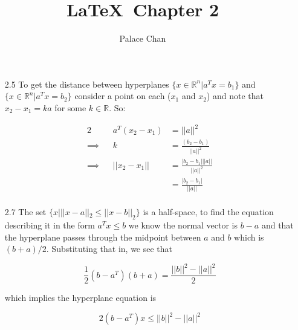 \documentclass[12pt]{article}
\title{\LaTeX\ Chapter 2}
\author{Palace Chan}
\begin{document}
\maketitle
\newpage

\begin{itemize}

\item[2.5]
  To get the distance between hyperplanes $\{x \in \mathbb{R}^n | a^T x = b_1 \}$ and $\{x \in \mathbb{R}^n | a^T x = b_2 \}$ consider a point on each ($x_1$ and $x_2$) and note that $x_2 - x_1 = ka$ for some $k \in \mathbb{R}$. So:
  
  \begin{alignat*}{2}
    & & a^T(x_2 - x_1) & = ||a||^2 \\
    \implies & & k & = \frac{(b_2 - b_1)}{||a||^2} \\
    \implies & &||x_2 - x_1|| & = \frac{|b_2 - b_1|||a||}{||a||^2} \\
    & &                      & = \frac{|b_2 - b_1|}{||a||} \\
  \end{alignat*}
\item[2.7]
  The set $\{x | ||x - a||_2 \leq ||x - b||_2\}$ is a half-space, to find the equation describing it in the form $a^Tx \leq b$ we know the normal vector is $b - a$ and that the hyperplane passes through the midpoint between $a$ and $b$ which is $(b+a)/2$. Substituting that in, we see that

  \[
    \frac{1}{2} (b-a^T)(b+a) = \frac{||b||^2 - ||a||^2}{2}
  \]

  which implies the hyperplane equation is
  
  \[
    2(b-a^T)x \leq ||b||^2 - ||a||^2
  \]  


\end{itemize}
\end{document}
